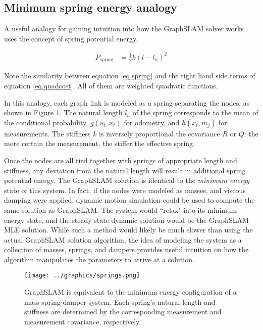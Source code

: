 \subsection{Minimum spring energy analogy}

A useful analogy for gaining intuition into how the GraphSLAM solver works uses the concept of spring potential energy. 

\begin{align}
P_{\text{spring}} &= \frac{1}{2}k\left(l-l_n\right)^2
\label{eq.spring}
\end{align}

Note the similarity between equation \ref{eq.spring} and the right hand side terms of equation \ref{eq.quadcost}. All of them are weighted quadratic functions.

In this analogy, each graph link is modeled as a spring separating the nodes, as shown in Figure \ref{fig:springs}. The natural length $l_n$ of the spring corresponds to the mean of the conditional probability,  $g\left(u_t,x_t\right)$ for odometry, and $h\left(x_t,m_j\right)$ for measurements. The stiffness $k$ is inversely proportional the covariance $R$ or $Q$: the more certain the measurement, the stiffer the effective spring. 

Once the nodes are all tied together with springs of appropriate length and stiffness, any deviation from the natural length will result in additional spring potential energy. The GraphSLAM solution is identical to the \emph{minimum energy} state of this system. In fact, if the nodes were modeled as masses, and viscous damping were applied, dynamic motion simulation could be used to compute the same solution as GraphSLAM. The system would ``relax" into its minimum energy state, and the steady state dynamic solution would be the GraphSLAM MLE solution. While such a method would likely be much slower than using the actual GraphSLAM solution algorithm, the idea of modeling the system as a collection of masses, springs, and dampers provides useful intuition on how the algorithm manipulates the parameters to arrive at a solution.

\begin{figure}[htb]
   \centering
   \texttt{[image: ../graphics/springs.png]} %
   \caption{GraphSLAM is equivalent to the minimum energy configuration of a mass-spring-damper system. Each spring's natural length and stiffness are determined by the corresponding measurement and measurement covariance, respectively.}
   \label{fig:springs}
\end{figure}




